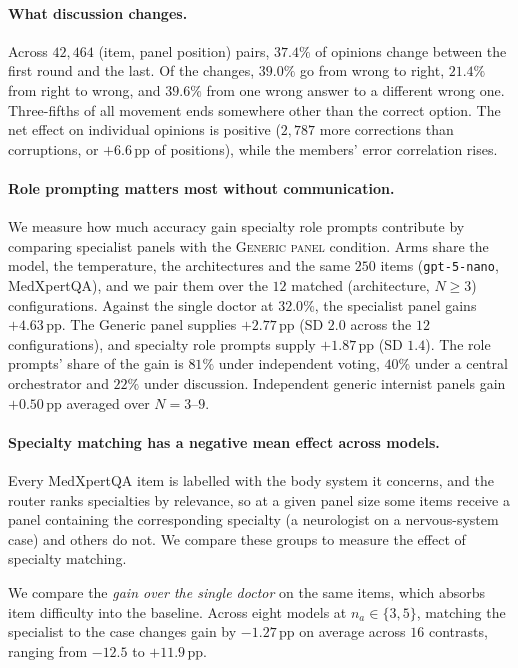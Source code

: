 \paragraph{What discussion changes.}
Across $42{,}464$ (item, panel position) pairs,
$37.4\%$ of opinions change between the first round and the last. Of the changes, $39.0\%$ go from wrong to right,
$21.4\%$ from right to wrong, and $39.6\%$ from one wrong answer to a different wrong
one. Three-fifths of all movement ends somewhere other than the correct option. The net effect on
individual opinions is positive ($2{,}787$ more corrections than corruptions, or $+6.6$\,pp of
positions), while the members' error correlation rises.

\paragraph{Role prompting matters most without communication.}
We measure how much accuracy gain specialty role prompts contribute by comparing specialist
panels with the \textsc{Generic panel} condition. Arms
share the model, the temperature, the architectures and the same $250$ items
(\texttt{gpt-5-nano}, MedXpertQA), and we pair them over the $12$ matched
(architecture, $N \geq 3$) configurations. Against the single doctor at $32.0\%$, the specialist
panel gains $+4.63$\,pp. The Generic panel supplies $+2.77$\,pp (SD $2.0$ across the $12$
configurations), and specialty role prompts supply $+1.87$\,pp (SD $1.4$).
The role prompts' share of the gain is $81\%$ under independent voting, $40\%$ under a central
orchestrator and $22\%$ under discussion. Independent generic internist panels gain $+0.50$\,pp
averaged over $N = 3$--$9$.

\paragraph{Specialty matching has a negative mean effect across models.}
Every MedXpertQA item is labelled with the body system it concerns, and
the router ranks specialties by relevance, so at a given panel size some items receive a panel
containing the corresponding specialty (a neurologist on a nervous-system case) and others do
not. We compare these groups to measure the effect of specialty matching.

We compare the \emph{gain over the single doctor} on the same items, which absorbs item difficulty
into the baseline. Across eight models at $n_a \in \{3,5\}$, matching the specialist to the case
changes gain by $-1.27$\,pp on average across $16$ contrasts, ranging from $-12.5$ to $+11.9$\,pp.

